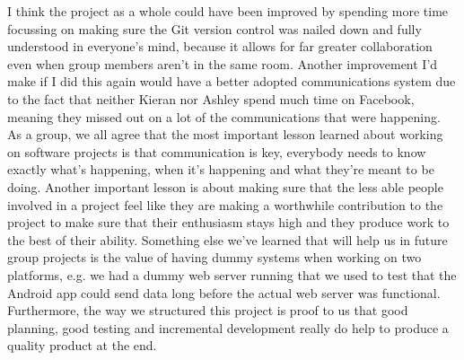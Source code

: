 \documentclass{article}
\begin{document}
		I think the project as a whole could have been improved by spending more time focussing on making sure the Git version control was nailed down and fully understood in everyone’s mind, because it allows for far greater collaboration even when group members aren't in the same room. Another improvement I’d make if I did this again would have a better adopted communications system due to the fact that neither Kieran nor Ashley spend much time on Facebook, meaning they missed out on a lot of the communications that were happening. \\

		As a group, we all agree that the most important lesson learned about working on software projects is that communication is key, everybody needs to know exactly what's happening, when it's happening and what they're meant to be doing. Another important lesson is about making sure that the less able people involved in a project feel like they are making a worthwhile contribution to the project to make sure that their enthusiasm stays high and they produce work to the best of their ability. Something else we've learned that will help us in future group projects is the value of having dummy systems when working on two platforms, e.g. we had a dummy web server running that we used to test that the Android app could send data long before the actual web server was functional. Furthermore, the way we structured this project is proof to us that good planning, good testing and incremental development really do help to produce a quality product at the end.
	
\end{document}
